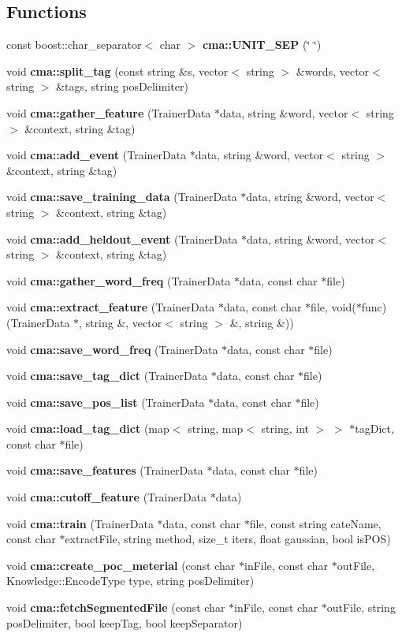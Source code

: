 \subsection*{Functions}
\begin{CompactItemize}
\item 
const boost::char\_\-separator$<$ char $>$ \textbf{cma::UNIT\_\-SEP} (\char`\"{} \char`\"{})\label{namespacecma_f0620dd94c72d29cdfd5879862a0fa3c}

\item 
void {\bf cma::split\_\-tag} (const string \&s, vector$<$ string $>$ \&words, vector$<$ string $>$ \&tags, string posDelimiter)
\item 
void {\bf cma::gather\_\-feature} (TrainerData $\ast$data, string \&word, vector$<$ string $>$ \&context, string \&tag)
\item 
void {\bf cma::add\_\-event} (TrainerData $\ast$data, string \&word, vector$<$ string $>$ \&context, string \&tag)
\item 
void {\bf cma::save\_\-training\_\-data} (TrainerData $\ast$data, string \&word, vector$<$ string $>$ \&context, string \&tag)
\item 
void {\bf cma::add\_\-heldout\_\-event} (TrainerData $\ast$data, string \&word, vector$<$ string $>$ \&context, string \&tag)
\item 
void {\bf cma::gather\_\-word\_\-freq} (TrainerData $\ast$data, const char $\ast$file)
\item 
void {\bf cma::extract\_\-feature} (TrainerData $\ast$data, const char $\ast$file, void($\ast$func)(TrainerData $\ast$, string \&, vector$<$ string $>$ \&, string \&))
\item 
void {\bf cma::save\_\-word\_\-freq} (TrainerData $\ast$data, const char $\ast$file)
\item 
void {\bf cma::save\_\-tag\_\-dict} (TrainerData $\ast$data, const char $\ast$file)
\item 
void \textbf{cma::save\_\-pos\_\-list} (TrainerData $\ast$data, const char $\ast$file)\label{namespacecma_3f1398255ff5b9455a32b5c26b37c73d}

\item 
void {\bf cma::load\_\-tag\_\-dict} (map$<$ string, map$<$ string, int $>$ $>$ $\ast$tagDict, const char $\ast$file)
\item 
void {\bf cma::save\_\-features} (TrainerData $\ast$data, const char $\ast$file)
\item 
void {\bf cma::cutoff\_\-feature} (TrainerData $\ast$data)
\item 
void {\bf cma::train} (TrainerData $\ast$data, const char $\ast$file, const string cateName, const char $\ast$extractFile, string method, size\_\-t iters, float gaussian, bool isPOS)
\item 
void {\bf cma::create\_\-poc\_\-meterial} (const char $\ast$inFile, const char $\ast$outFile, Knowledge::EncodeType type, string posDelimiter)
\item 
void {\bf cma::fetchSegmentedFile} (const char $\ast$inFile, const char $\ast$outFile, string posDelimiter, bool keepTag, bool keepSeparator)
\end{CompactItemize}


